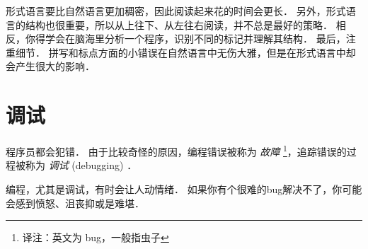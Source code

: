 
形式语言要比自然语言更加稠密，因此阅读起来花的时间会更长． 另外，形式语言的结构也很重要，所以从上往下、从左往右阅读，并不总是最好的策略． 相反，你得学会在脑海里分析一个程序，识别不同的标记并理解其结构． 最后，注重细节． 拼写和标点方面的小错误在自然语言中无伤大雅，但是在形式语言中却会产生很大的影响．

\section{调试}
  


程序员都会犯错． 由于比较奇怪的原因，编程错误被称为 {\em 故障} \footnote{译注：英文为 bug，一般指虫子}，追踪错误的过程被称为 {\em 调试} (debugging) ．
  
  


编程，尤其是调试，有时会让人动情绪．  如果你有个很难的bug解决不了，你可能会感到愤怒、沮丧抑或是难堪．


